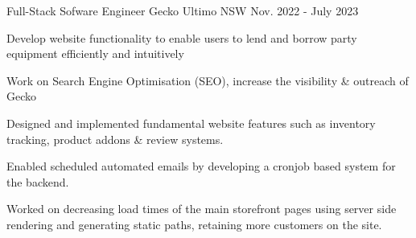 

\begin{cventries}

  \cventry
    {Full-Stack Sofware Engineer} %
    {Gecko} %
    {Ultimo NSW} %
    {Nov. 2022 - July 2023} %
    {
      \vspace{-4.0mm}
      \begin{cvsubentries}
      \end{cvsubentries}
      \vspace{4.0mm}
      \begin{cvitems} %
      \item {Develop website functionality to enable users to lend and borrow party equipment efficiently and intuitively}
      \item {Work on Search Engine Optimisation (SEO), increase the visibility \& outreach of Gecko}
      \end{cvitems} 
      \begin{cvsubentries}
      \end{cvsubentries}
      \vspace{4.0mm}
      \begin{cvitems} %
      \item {Designed and implemented fundamental website features such as inventory tracking, product addons \& review systems.}
      \item {Enabled scheduled automated emails by developing a cronjob based system for the backend.}
      \item {Worked on decreasing load times of the main storefront pages using server side rendering and generating static paths, retaining more customers on the site.}
      \end{cvitems} 
    }



\end{cventries}
